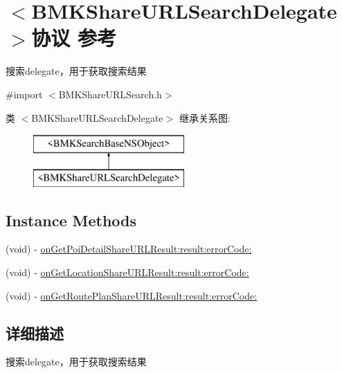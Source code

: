 \hypertarget{protocol_b_m_k_share_u_r_l_search_delegate-p}{}\section{$<$B\+M\+K\+Share\+U\+R\+L\+Search\+Delegate$>$协议 参考}
\label{protocol_b_m_k_share_u_r_l_search_delegate-p}


搜索delegate，用于获取搜索结果  




{\ttfamily \#import $<$B\+M\+K\+Share\+U\+R\+L\+Search.\+h$>$}

类 $<$B\+M\+K\+Share\+U\+R\+L\+Search\+Delegate$>$ 继承关系图\+:\begin{figure}[H]
\begin{center}
\leavevmode
\includegraphics[height=2.000000cm]{protocol_b_m_k_share_u_r_l_search_delegate-p}
\end{center}
\end{figure}
\subsection*{Instance Methods}
\begin{DoxyCompactItemize}
\item 
(void) -\/ \hyperlink{protocol_b_m_k_share_u_r_l_search_delegate-p_a585f4e1aa26bb11f59bd624c0e513cd6}{on\+Get\+Poi\+Detail\+Share\+U\+R\+L\+Result\+:result\+:error\+Code\+:}
\item 
(void) -\/ \hyperlink{protocol_b_m_k_share_u_r_l_search_delegate-p_a856efc4ec1a61f942bd5c025f29fc83c}{on\+Get\+Location\+Share\+U\+R\+L\+Result\+:result\+:error\+Code\+:}
\item 
(void) -\/ \hyperlink{protocol_b_m_k_share_u_r_l_search_delegate-p_a04fa292234fc3f9cdc03917291cb9256}{on\+Get\+Route\+Plan\+Share\+U\+R\+L\+Result\+:result\+:error\+Code\+:}
\end{DoxyCompactItemize}


\subsection{详细描述}
搜索delegate，用于获取搜索结果 

